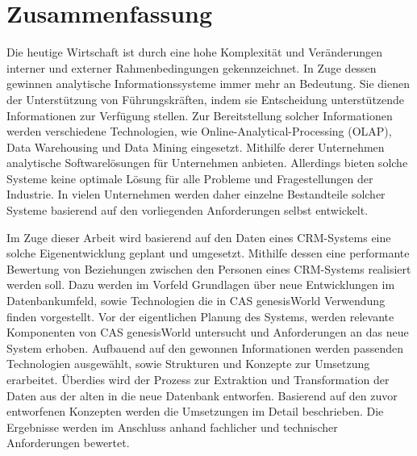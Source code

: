 
\chapter*{\centering Zusammenfassung}

Die heutige Wirtschaft ist durch eine hohe Komplexität und Veränderungen interner und externer Rahmenbedingungen gekennzeichnet. In Zuge dessen gewinnen analytische Informationssysteme immer mehr an Bedeutung. Sie dienen der Unterstützung von Führungskräften, indem sie Entscheidung unterstützende Informationen zur Verfügung stellen. Zur Bereitstellung solcher Informationen werden verschiedene Technologien, wie Online-Analytical-Processing (OLAP), Data Warehousing und Data Mining eingesetzt. Mithilfe derer Unternehmen analytische Softwarelösungen für Unternehmen anbieten. Allerdings bieten solche Systeme keine optimale Lösung für alle Probleme und Fragestellungen der Industrie. In vielen Unternehmen werden daher einzelne Bestandteile solcher Systeme basierend auf den vorliegenden Anforderungen selbst entwickelt.

Im Zuge dieser Arbeit wird basierend auf den Daten eines CRM-Systems eine solche Eigenentwicklung geplant und umgesetzt. Mithilfe dessen eine performante Bewertung von Beziehungen zwischen den Personen eines CRM-Systems realisiert werden soll. Dazu werden im Vorfeld Grundlagen über neue Entwicklungen im Datenbankumfeld, sowie Technologien die in CAS genesisWorld Verwendung finden vorgestellt. Vor der eigentlichen Planung des Systems, werden relevante Komponenten von CAS genesisWorld untersucht und Anforderungen an das neue System erhoben. Aufbauend auf den gewonnen Informationen  werden passenden Technologien ausgewählt, sowie Strukturen und Konzepte zur Umsetzung erarbeitet. Überdies wird der Prozess zur Extraktion und Transformation der Daten aus der alten in die neue Datenbank entworfen. Basierend auf den zuvor entworfenen Konzepten werden die Umsetzungen im Detail beschrieben. Die Ergebnisse werden im Anschluss anhand fachlicher und technischer Anforderungen bewertet.
